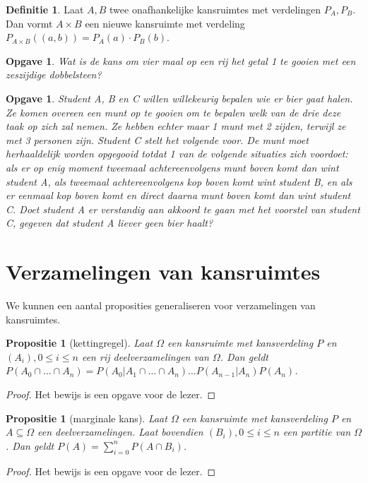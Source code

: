 \documentclass[a4paper]{book}
\newtheorem{proposition}[theorem]{Propositie}
\newtheorem{exercise}[theorem]{Opgave}
\theoremstyle{definition}
\newtheorem{definition}[theorem]{Definitie}
\begin{document}
\begin{definition}
    Laat $A,B$ twee onafhankelijke kansruimtes met verdelingen $P_A,P_B$.
    Dan vormt $A \times B$ een nieuwe kansruimte met verdeling $P_{A \times B}((a,b)) = P_A(a) \cdot P_B(b)$.
\end{definition}

\begin{exercise}
Wat is de kans om vier maal op een rij het getal 1 te gooien met een zeszijdige dobbelsteen?
\end{exercise}

\begin{exercise}
Student A, B en C willen willekeurig bepalen wie er bier gaat halen.
Ze komen overeen een munt op te gooien om te bepalen welk van de drie deze taak op zich zal nemen.
Ze hebben echter maar 1 munt met 2 zijden, terwijl ze met 3 personen zijn. Student C stelt het volgende voor. De munt moet herhaaldelijk worden opgegooid
totdat 1 van de volgende situaties zich voordoet: als er op enig moment tweemaal achtereenvolgens munt boven komt dan wint student A, als tweemaal
achtereenvolgens kop boven komt wint student B, en als er eenmaal kop boven komt en direct daarna munt boven komt dan wint student C. Doet student A er
verstandig aan akkoord te gaan met het voorstel van student C, gegeven dat student A liever geen bier haalt?
\end{exercise}


\section{Verzamelingen van kansruimtes}
We kunnen een aantal proposities generaliseren voor verzamelingen van kansruimtes.

\begin{proposition}[kettingregel]
    Laat $\Omega$ een kansruimte met kansverdeling $P$ en $(A_i), 0 \leq i \leq n$ een rij deelverzamelingen van $\Omega$.
    Dan geldt $P(A_0 \cap \dots \cap A_n) = P(A_0|A_1 \cap \dots \cap A_n) \dots P(A_{n-1}|A_n)P(A_n)$.
\end{proposition}
\begin{proof}
    Het bewijs is een opgave voor de lezer.
\end{proof}

\begin{proposition}[marginale kans]
    Laat $\Omega$ een kansruimte met kansverdeling $P$ en $A \subseteq \Omega$ een deelverzamelingen.
    Laat bovendien $(B_i), 0 \leq i \leq n$ een partitie van $\Omega$.
    Dan geldt $P(A) = \sum_{i=0}^n P(A \cap B_i)$.
\end{proposition}
\begin{proof}
    Het bewijs is een opgave voor de lezer.
\end{proof}
\end{document}
